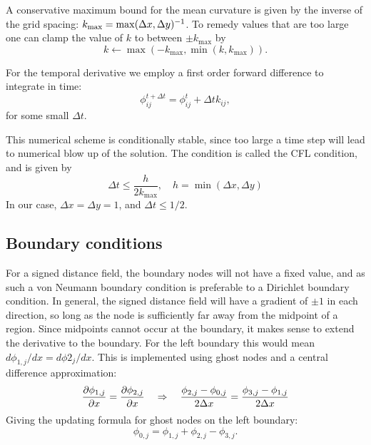 \documentclass[sigconf]{acmart}
\begin{document}
A conservative maximum bound for the mean curvature is given by the inverse of the grid spacing: $ k_{\max} = \max(\Delta x, \Delta y)^{-1} $. To remedy values that are too large one can clamp the value of $ k $ to between $ \pm k_{\max} $ by
\begin{equation}\label{key}
	k\leftarrow \max(-k_{\max}, \min(k, k_{\max})).
\end{equation}

For the temporal derivative we employ a first order forward difference to integrate in time:
\begin{equation}\label{key}
	\phi_{ij}^{t+\Delta t} = \phi_{ij}^t + \Delta t k_{ij}, 
\end{equation}
for some small $ \Delta t $.

This numerical scheme is conditionally stable, since too large a time step will lead to numerical blow up of the solution. The condition is called the CFL condition, and is given by
\begin{equation}\label{key}
	\Delta t \leq \frac{h}{2k_{\max}}, \quad h = \min(\Delta x, \Delta y)
\end{equation}
In our case, $ \Delta x = \Delta y = 1 $, and $ \Delta t \leq 1/2 $.

\subsection{Boundary conditions}
For a signed distance field, the boundary nodes will not have a fixed value, and as such a von Neumann boundary condition is preferable to a Dirichlet boundary condition. In general, the signed distance field will have a gradient of $ \pm 1 $ in each direction, so long as the node is sufficiently far away from the midpoint of a region. Since midpoints cannot occur at the boundary, it makes sense to extend the derivative to the boundary. For the left boundary this would mean $ d\phi_{1,j}/dx = d\phi{2_j}/dx$. This is implemented using ghost nodes and a central difference approximation:
\begin{equation}\label{key}
	\frac{\partial \phi_{1,j}}{\partial x} = \frac{\partial \phi_{2,j}}{\partial x} \quad \Rightarrow \quad \frac{\phi_{2,j} - \phi_{0,j}}{2\Delta x} = \frac{\phi_{3,j} - \phi_{1,j}}{2 \Delta x}
\end{equation}
Giving the updating formula for ghost nodes on the left boundary:
\begin{equation}\label{key}
	\phi_{0,j} = \phi_{1,j} + \phi_{2,j} - \phi_{3,j}.
\end{equation}
\end{document}
